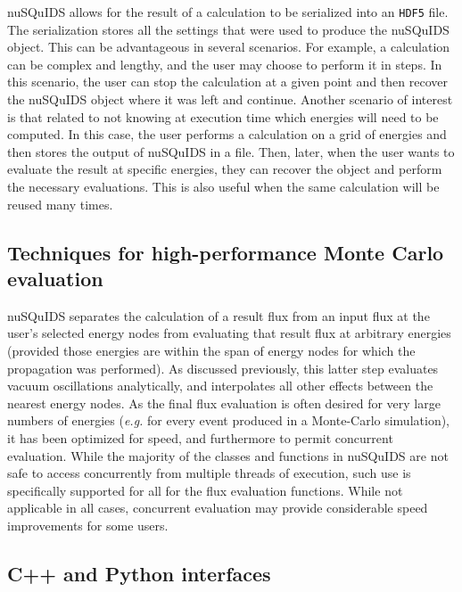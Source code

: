 \documentclass[3p,12pt]{elsarticle}
\newcommand{\ttf}{\ttfamily}
\begin{document}
{\ttf nuSQuIDS} allows for the result of a calculation to be serialized into an \texttt{HDF5} file.
The serialization stores all the settings that were used to produce the {\ttf nuSQuIDS} object.
This can be advantageous in several scenarios.
For example, a calculation can be complex and lengthy, and the user may choose to perform it in steps.
In this scenario, the user can stop the calculation at a given point and then recover the {\ttf nuSQuIDS} object where it was left and continue.
Another scenario of interest is that related to not knowing at execution time which energies will need to be computed.
In this case, the user performs a calculation on a grid of energies and then stores the output of {\ttf nuSQuIDS} in a file.
Then, later, when the user wants to evaluate the result at specific energies, they can recover the object and perform the necessary evaluations.
This is also useful when the same calculation will be reused many times. 

\subsection{Techniques for high-performance Monte Carlo evaluation}
{\ttf nuSQuIDS} separates the calculation of a result flux from an input flux at the user's selected energy nodes from evaluating that result flux at arbitrary energies (provided those energies are within the span of energy nodes for which the propagation was performed). 
As discussed previously, this latter step evaluates vacuum oscillations analytically, and interpolates all other effects between the nearest energy nodes. 
As the final flux evaluation is often desired for very large numbers of energies (\textit{e.g.} for every event produced in a Monte-Carlo simulation), it has been optimized for speed, and furthermore to permit concurrent evaluation. 
While the majority of the classes and functions in {\ttf nuSQuIDS} are not safe to access concurrently from multiple threads of execution, such use is specifically supported for all for the flux evaluation functions. 
While not applicable in all cases, concurrent evaluation may provide considerable speed improvements for some users. 

\subsection{{\ttf C++} and {\ttf Python} interfaces}
\end{document}
